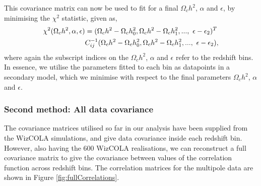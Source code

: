 \documentclass[a4paper,fleqn,usenatbib]{mnras}
\begin{document}
This covariance matrix can now be used to fit for a final $\Omega_c h^2$, $\alpha$ and $\epsilon$, by minimising the $\chi^2$ statistic, given as,
\begin{align} \label{eq:covchi}
\chi^2(\Omega_c h^2, \alpha, \epsilon) &= (\Omega_c h^2 - \Omega_c h^2_0, \Omega_c h^2 - \Omega_c h^2_1, ...,\  \epsilon - \epsilon_2)^T \notag \\
 &C_{ij}^{-1}(\Omega_c h^2 - \Omega_c h^2_0, \Omega_c h^2 - \Omega_c h^2_1, ...,\  \epsilon - \epsilon_2),
\end{align}
where again the subscript indices on the $\Omega_c h^2$, $\alpha$ and $\epsilon$ refer to the redshift bins. In essence, we utilise the parameters fitted to each bin as datapoints in a secondary model, which we minimise with respect to the final parameters $\Omega_c h^2$, $\alpha$ and $\epsilon$.




\subsubsection{Second method: All data covariance} \label{sec:allData}

The covariance matrices utilised so far in our analysis have been supplied from the WizCOLA simulations, and give data covariance inside each redshift bin. However, also having the 600 WizCOLA realisations, we can reconstruct a full covariance matrix to give the covariance between values of the correlation function across redshift bins. The correlation matrices for the multipole data are shown in Figure \ref{fig:fullCorrelations}.
\end{document}
